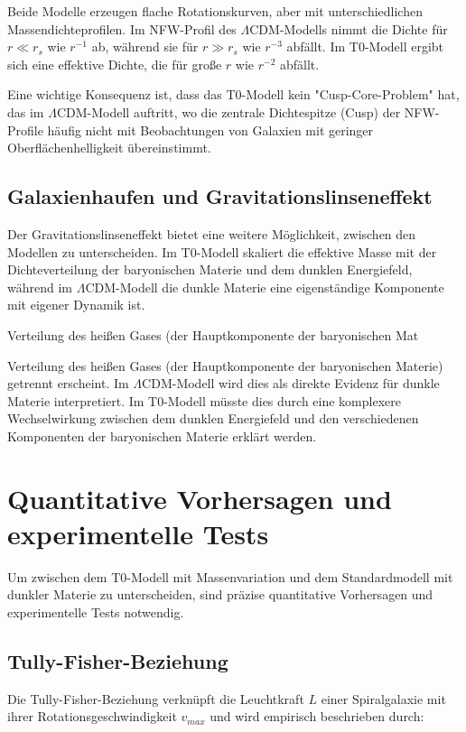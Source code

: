 \documentclass[a4paper,12pt]{article}
\begin{document}
	Beide Modelle erzeugen flache Rotationskurven, aber mit unterschiedlichen Massendichteprofilen. Im NFW-Profil des $\Lambda$CDM-Modells nimmt die Dichte für $r \ll r_s$ wie $r^{-1}$ ab, während sie für $r \gg r_s$ wie $r^{-3}$ abfällt. Im T0-Modell ergibt sich eine effektive Dichte, die für große $r$ wie $r^{-2}$ abfällt.
	
	Eine wichtige Konsequenz ist, dass das T0-Modell kein "Cusp-Core-Problem" hat, das im $\Lambda$CDM-Modell auftritt, wo die zentrale Dichtespitze (Cusp) der NFW-Profile häufig nicht mit Beobachtungen von Galaxien mit geringer Oberflächenhelligkeit übereinstimmt.
	
	\subsection{Galaxienhaufen und Gravitationslinseneffekt}
	
	Der Gravitationslinseneffekt bietet eine weitere Möglichkeit, zwischen den Modellen zu unterscheiden. Im T0-Modell skaliert die effektive Masse mit der Dichteverteilung der baryonischen Materie und dem dunklen Energiefeld, während im $\Lambda$CDM-Modell die dunkle Materie eine eigenständige Komponente mit eigener Dynamik ist.
	
	Verteilung des heißen Gases (der Hauptkomponente der baryonischen Mat
	
	Verteilung des heißen Gases (der Hauptkomponente der baryonischen Materie) getrennt erscheint. Im $\Lambda$CDM-Modell wird dies als direkte Evidenz für dunkle Materie interpretiert. Im T0-Modell müsste dies durch eine komplexere Wechselwirkung zwischen dem dunklen Energiefeld und den verschiedenen Komponenten der baryonischen Materie erklärt werden.
	
	\section{Quantitative Vorhersagen und experimentelle Tests}
	
	Um zwischen dem T0-Modell mit Massenvariation und dem Standardmodell mit dunkler Materie zu unterscheiden, sind präzise quantitative Vorhersagen und experimentelle Tests notwendig.
	
	\subsection{Tully-Fisher-Beziehung}
	
	Die Tully-Fisher-Beziehung verknüpft die Leuchtkraft $L$ einer Spiralgalaxie mit ihrer Rotationsgeschwindigkeit $v_{max}$ und wird empirisch beschrieben durch:
	
\end{document}
